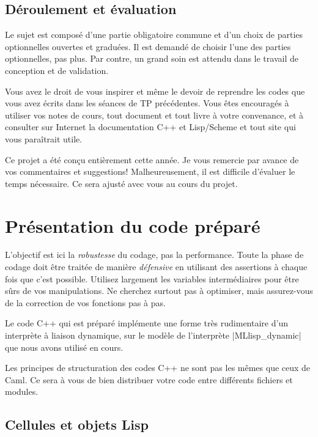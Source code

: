 \documentclass{../../../LaTeX/tdsimple}
\begin{document}
  \subsection*{Déroulement et évaluation}

  Le sujet est composé d'une partie obligatoire commune et d'un choix
  de parties optionnelles ouvertes et graduées. Il est demandé de
  choisir l'une des parties optionnelles, pas plus. Par contre, un
  grand soin est attendu dans le travail de conception et de
  validation.

  Vous avez le droit de vous inspirer et même le devoir de reprendre
  les codes que vous avez écrits dans les séances de TP
  précédentes. Vous êtes encouragés à utiliser vos notes de cours,
  tout document et tout livre à votre convenance, et à consulter sur
  Internet la documentation C++ et Lisp/Scheme et tout site qui vous
  paraîtrait utile.

  Ce projet a été conçu entièrement cette année. Je vous remercie par
  avance de vos commentaires et suggestions!  Malheureusement, il est
  difficile d'évaluer le temps nécessaire. Ce sera ajusté avec vous au
  cours du projet.

  \section{Présentation du code préparé}

  \begin{attention}
    L'objectif est ici la \emph{robustesse} du codage, pas la
    performance. Toute la phase de codage doit être traitée de manière
    \emph{défensive} en utilisant des assertions à chaque fois
    que c'est possible. Utilisez largement les variables
    intermédiaires pour être sûrs de vos manipulations. Ne cherchez surtout
    pas à optimiser, mais assurez-vous de la correction de vos
    fonctions pas à pas.
  \end{attention}

  Le code C++ qui est préparé implémente une forme très rudimentaire
  d'un interprète à liaison dynamique, sur le modèle de l'interprète
  \file|MLlisp_dynamic| que nous avons utilisé en cours.

  Les principes de structuration des codes C++ ne sont pas les mêmes
  que ceux de Caml. Ce sera à vous de bien distribuer votre code entre
  différents fichiers et modules.

\subsection{Cellules et objets Lisp}
\end{document}
